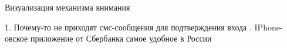 \documentclass{beamer}
\begin{document}
\begin{frame}{Визуализация механизма внимания}

1.
\colorbox{yellow!70}{Почему-то}
\colorbox{yellow!100}{не}
\colorbox{yellow!57}{приходят}
\colorbox{yellow!17}{смс-сообщения}
\colorbox{yellow!5}{для}
\colorbox{yellow!7}{подтверждения}
\colorbox{yellow!0}{входа}
\linebreak
\linebreak
{}.
\colorbox{yellow!3}{IPhone-овское}
\colorbox{yellow!2}{приложение}
\colorbox{yellow!2}{от}
\colorbox{yellow!30}{Сбербанка}
\colorbox{yellow!89}{самое}
\colorbox{yellow!100}{удобное}
\colorbox{yellow!84}{в}
\colorbox{yellow!82}{России}




\end{frame}
\end{document}
